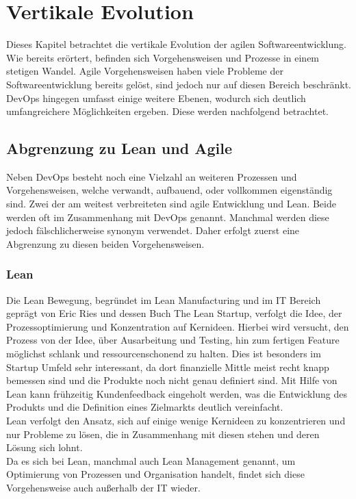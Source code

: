 \chapter{Vertikale Evolution} %
Dieses Kapitel betrachtet die vertikale Evolution der agilen Softwareentwicklung. Wie bereits erörtert, befinden sich Vorgehensweisen und Prozesse in einem stetigen Wandel. Agile Vorgehensweisen haben viele Probleme der Softwareentwicklung bereits gelöst, sind jedoch nur auf diesen Bereich beschränkt. DevOps hingegen umfasst einige weitere Ebenen, wodurch sich deutlich umfangreichere Möglichkeiten ergeben. Diese werden nachfolgend betrachtet.


\section{Abgrenzung zu Lean und Agile} %
Neben DevOps besteht noch eine Vielzahl an weiteren Prozessen und Vorgehensweisen, welche verwandt, aufbauend, oder vollkommen eigenständig sind. Zwei der am weitest verbreiteten sind agile Entwicklung und Lean. Beide werden oft im Zusammenhang mit DevOps genannt. Manchmal werden diese jedoch fälschlicherweise synonym verwendet. Daher erfolgt zuerst eine Abgrenzung zu diesen beiden Vorgehensweisen.

\subsection{Lean}
Die Lean Bewegung, begründet im Lean Manufacturing und im IT Bereich geprägt von Eric Ries und dessen Buch \glqq The Lean Startup\grqq, verfolgt die Idee, der Prozessoptimierung und Konzentration auf Kernideen. Hierbei wird versucht, den Prozess von der Idee, über Ausarbeitung und Testing, hin zum fertigen Feature möglichst schlank und ressourcenschonend zu halten. Dies ist besonders im Startup Umfeld sehr interessant, da dort finanzielle Mittle meist recht knapp bemessen sind und die Produkte noch nicht genau definiert sind. Mit Hilfe von Lean kann frühzeitig Kundenfeedback eingeholt werden, was die Entwicklung des Produkts und die Definition eines Zielmarkts deutlich vereinfacht.\\
Lean verfolgt den Ansatz, sich auf einige wenige Kernideen zu konzentrieren und nur Probleme zu lösen, die in Zusammenhang mit diesen stehen und deren Lösung sich lohnt. \parencite[Vgl.][S. 18 ff.]{ries:2011} \\
Da es sich bei Lean, manchmal auch Lean Management genannt, um Optimierung von Prozessen und Organisation handelt, findet sich diese Vorgehensweise auch außerhalb der IT wieder.


